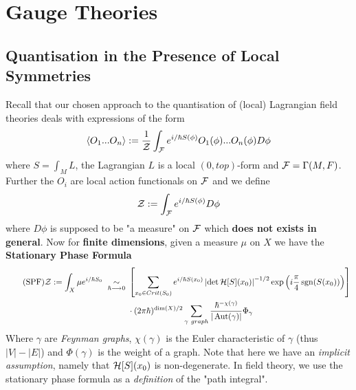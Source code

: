 \section{Gauge Theories}
\label{sec:Gauge_Theories}

\subsection{Quantisation in the Presence of Local Symmetries}

Recall that our chosen approach to the quantisation of (local) Lagrangian field theories deals with expressions of the form
\begin{equation}\langle O_1 ... O_n \rangle := \frac{1}{\ZF} \int_\FF e^{i/\hbar S(\phi)} O_1(\phi) ... O_n(\phi) D\phi \end{equation}
where $S = \int_M L$, the Lagrangian $L$ is a local $(0,top)$-form and ${\mathcal{F}} = \Gamma(M, F)$. Further the $O_i$ are local action functionals on ${\mathcal{F}}$ and we define
\begin{equation}\ZF := \int_\FF e^{i/\hbar S(\phi)} D\phi \end{equation}
where $D\phi$ is supposed to be "a measure" on ${\mathcal{F}}$ which \textbf{does not exists in general}. Now for \textbf{finite dimensions}, given a measure $\mu$ on $X$ we have the \textbf{Stationary Phase Formula}
\begin{align}\label{eq:StatPhase}\tag{SPF}
  \ZF := \int_X \mu e^{i/\hbar S_0} \ \underset{\hbar \lra 0}{\sim} \ &\left[ \sum_{x_0 \in Crit(S_0)} e^{i/\hbar S(x_0)} \left|\det\HH[S](x_0)\right|^{-1/2} \exp\left(i \frac{\pi}{4} \sgn(S(x_0))\right) \right]\\
   &\cdot (2\pi \hbar)^{\dim(X)/2} \sum_{\gamma \ graph} \frac{\hbar^{-\chi(\gamma)}}{|\Aut(\gamma)|} \Phi_\gamma \nonumber
\end{align}
Where $\gamma$ are \emph{Feynman graphs}, $\chi(\gamma)$ is the Euler characteristic of $\gamma$ (thus $|V|-|E|$) and $\Phi(\gamma)$ is the weight of a graph. Note that here we have an \emph{implicit assumption}, namely that ${\mathcal{H}}[S](x_0)$ is non-degenerate. In field theory, we use the stationary phase formula as a \emph{definition} of the "path integral".\\


